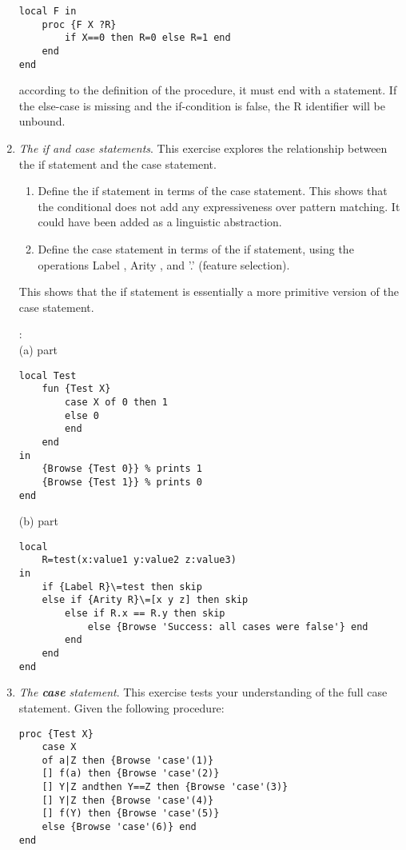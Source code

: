 \documentclass[11pt]{article}
\begin{document}
\begin{enumerate}
\begin{verbatim}
local F in
    proc {F X ?R}
        if X==0 then R=0 else R=1 end
    end
end
\end{verbatim}

according to the definition of the procedure, it must end with a statement. If the else-case is missing and the if-condition is false, the R identifier will be unbound.

\item {\itshape The if and case statements}. This exercise explores the relationship between the if statement and the case statement.

\begin{enumerate}
\item Deﬁne the if statement in terms of the case statement. This shows that
the conditional does not add any expressiveness over pattern matching. It could
have been added as a linguistic abstraction.
\item Deﬁne the case statement in terms of the if statement, using the operations Label , Arity , and '.' (feature selection).
\end{enumerate}

This shows that the if statement is essentially a more primitive version of the case
statement.


:
\\(a) part
\begin{verbatim}
local Test
    fun {Test X}
        case X of 0 then 1
        else 0
        end
    end
in    
    {Browse {Test 0}} % prints 1
    {Browse {Test 1}} % prints 0
end   
\end{verbatim}
(b) part
\begin{verbatim}
local
    R=test(x:value1 y:value2 z:value3)
in
    if {Label R}\=test then skip
    else if {Arity R}\=[x y z] then skip
        else if R.x == R.y then skip
            else {Browse 'Success: all cases were false'} end
        end 
    end
end
\end{verbatim}

\item {\itshape The {\bfseries case} statement}. This exercise tests your understanding of the full case
statement. Given the following procedure:
\begin{verbatim}
proc {Test X}
    case X
    of a|Z then {Browse 'case'(1)}
    [] f(a) then {Browse 'case'(2)}
    [] Y|Z andthen Y==Z then {Browse 'case'(3)}
    [] Y|Z then {Browse 'case'(4)}
    [] f(Y) then {Browse 'case'(5)}
    else {Browse 'case'(6)} end
end
\end{verbatim}


\end{enumerate}
\end{document}
